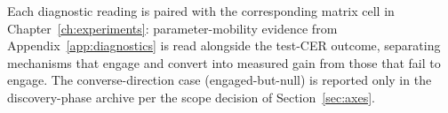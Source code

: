 Each diagnostic reading is paired with the corresponding matrix
cell in Chapter~\ref{ch:experiments}: parameter-mobility evidence
from Appendix~\ref{app:diagnostics} is read alongside the
test-CER outcome, separating mechanisms that engage and convert
into measured gain from those that fail to engage. The
converse-direction case (engaged-but-null) is reported only in
the discovery-phase archive per the scope decision of
Section~\ref{sec:axes}.
